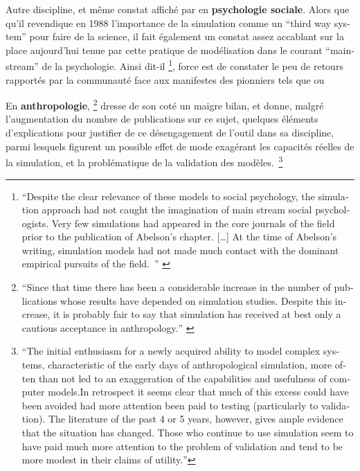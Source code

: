 Autre discipline, et même constat affiché par \textcite{Ostrom1988} en \textbf{psychologie sociale}. Alors que qu'il revendique en 1988 l'importance de la simulation comme un \foreignquote{english}{third way system} pour faire de la science, il fait également un constat assez accablant sur la place aujourd'hui tenue par cette pratique de modélisation dans le courant \foreignquote{english}{mainstream} de la psychologie. Ainsi dit-il \footnote{ \foreignquote{english}{Despite the clear relevance of these models to  social psychology, the simulation approach had not caught the imagination of main stream social psychologists. Very few simulations had appeared in the core journals of the field prior to the publication of Abelson's chapter. […] At the time of Abelson's writing, simulation models had not made much contact with the dominant empirical pursuits of the field. } \autocite[382]{Ostrom1988}}, force est de constater le peu de retours rapportés par la communauté face aux manifestes des pionniers tels que \textcite{Gullahorn1965} ou \textcite{Abelson1968} 

En \textbf{anthropologie}, \textcite{Dyke1981} \footnote{ \foreignquote{english}{Since that time there has been a considerable increase in the number of publications whose results have depended on simulation studies. Despite this increase, it is probably fair to say that simulation has received at best only a cautious acceptance in anthropology.} \autocite{Dyke1981} } dresse de son coté un maigre bilan, et donne, malgré l'augmentation du nombre de publications sur ce sujet, quelques éléments d'explications pour justifier de ce désengagement de l'outil dans sa discipline, parmi lesquels figurent un possible effet de mode exagérant les capacités réelles de la simulation, et la problématique de la validation des modèles. \footnote{\foreignquote{english}{The initial enthusiasm for a newly acquired ability to model complex systems, characteristic of the early days of anthropological simulation, more often than not led to an exaggeration of the capabilities and usefulness of computer models.In retrospect it seems clear that much of this excess could have been avoided had more attention been paid to testing (particularly to validation). The literature of the past 4 or 5 years, however, gives ample evidence that the situation has changed. Those who continue to use simulation seem to have paid much more attention to the problem of validation and tend to be more modest in their claims of utility.}}

